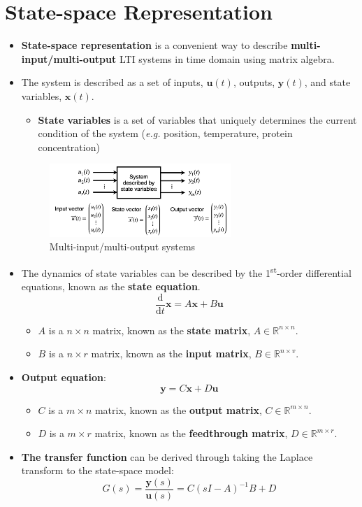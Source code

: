\section{State-space Representation}
\begin{itemize}
  \item \textbf{State-space representation} is a convenient way to describe \textbf{multi-input/multi-output} LTI systems in time domain using matrix algebra.
  
  \item The system is described as a set of inputs, $\mathbf{u}(t)$, outputs, $\mathbf{y}(t)$, and state variables, $\mathbf{x}(t)$.
  \begin{itemize}
    \item \textbf{State variables} is a set of variables that uniquely determines the current condition of the system (\textit{e.g.} position, temperature, protein concentration)
 \end{itemize}

    \begin{figure}[H] 
        \centering
        \includegraphics[width=0.65\textwidth]{images/multi_io.png}
        \caption{Multi-input/multi-output systems}
    \end{figure}

  \item The dynamics of state variables can be described by the 1\textsuperscript{st}-order differential equations, known as the \textbf{state equation}.
    \[\frac{\mathrm{d}}{\mathrm{d}t}\mathbf{x} = A\mathbf{x}+B\mathbf{u}\]
  \begin{itemize}
        \item $A$ is a $n\times n$ matrix, known as the \textbf{state matrix}, $ A \in \mathbb{R}^{n\times n}$.
        \item $B$ is a $n \times r$ matrix, known as the \textbf{input matrix}, $B \in \mathbb{R}^{n\times v}$.
  \end{itemize}
  
  \item \textbf{Output equation}: 
   \[\mathbf{y} = C\mathbf{x}+D\mathbf{u}\]
  \begin{itemize}
        \item $C$ is a $m\times n$ matrix, known as the \textbf{output matrix}, $ C \in \mathbb{R}^{m\times n}$.
        \item $D$ is a $m \times r$ matrix, known as the \textbf{feedthrough matrix}, $D \in \mathbb{R}^{m\times r}$.
  \end{itemize}
  
  \item \textbf{The transfer function} can be derived through taking the Laplace transform to the state-space model:
  \[G(s) = \frac{\mathbf{y}(s)}{\mathbf{u}(s)} = C(sI-A)^{-1}B+D\]
\end{itemize}
